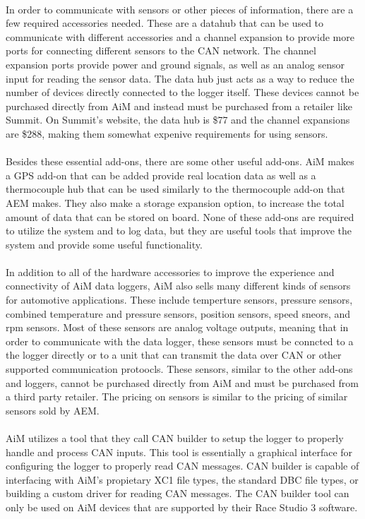 \paragraph{}
In order to communicate with sensors or other pieces of information, there are a few required accessories needed.
These are a datahub that can be used to communicate with different accessories and a channel expansion to provide more ports for connecting different sensors to the CAN network.
The channel expansion ports provide power and ground signals, as well as an analog sensor input for reading the sensor data.
The data hub just acts as a way to reduce the number of devices directly connected to the logger itself.
These devices cannot be purchased directly from AiM and instead must be purchased from a retailer like Summit.
On Summit's website, the data hub is \$77 and the channel expansions are \$288, making them somewhat expenive requirements for using sensors.

\paragraph{}
Besides these essential add-ons, there are some other useful add-ons.
AiM makes a GPS add-on that can be added provide real location data as well as a thermocouple hub that can be used similarly to the thermocouple add-on that AEM makes.
They also make a storage expansion option, to increase the total amount of data that can be stored on board.
None of these add-ons are required to utilize the system and to log data, but they are useful tools that improve the system and provide some useful functionality.

\paragraph{}
In addition to all of the hardware accessories to improve the experience and connectivity of AiM data loggers, AiM also sells many different kinds of sensors for automotive applications.
These include temperture sensors, pressure sensors, combined temperature and pressure sensors, position sensors, speed sneors, and rpm sensors.
Most of these sensors are analog voltage outputs, meaning that in order to communicate with the data logger, these sensors must be conncted to a the logger directly or to a unit that can transmit the data over CAN or other supported communication protoocls.
These sensors, similar to the other add-ons and loggers, cannot be purchased directly from AiM and must be purchased from a third party retailer.
The pricing on sensors is similar to the pricing of similar sensors sold by AEM.

\paragraph{}
AiM utilizes a tool that they call CAN builder to setup the logger to properly handle and process CAN inputs.
This tool is essentially a graphical interface for configuring the logger to properly read CAN messages.
CAN builder is capable of interfacing with AiM's propietary XC1 file types, the standard DBC file types, or building a custom driver for reading CAN messages.
The CAN builder tool can only be used on AiM devices that are supported by their Race Studio 3 software.